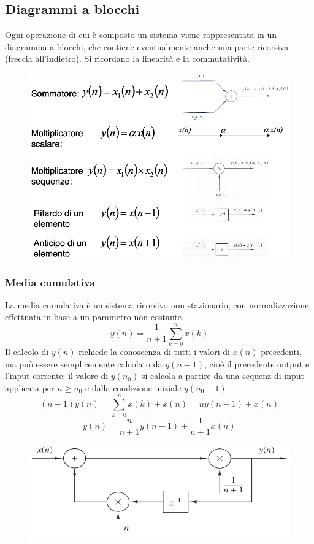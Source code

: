 \subsection{Diagrammi a blocchi}
Ogni operazione di cui è composto un sistema viene rappresentata in un diagramma a blocchi, che contiene eventualmente anche una parte ricorsiva (freccia all'indietro). Si ricordano la linearità e la commutatività.

\begin{figure}[h]
	\centering
	\includegraphics[scale=0.4]{Lezioni/Immagini/blocchi}
\end{figure}

\subsubsection{Media cumulativa}
La media cumulativa è un sistema ricorsivo non stazionario, con normalizzazione effettuata in base a un parametro non costante. 
$$y(n) = \frac{1}{n+1} \sum_{k=0}^{n}x(k)$$
Il calcolo di $y(n)$ richiede la conoscenza di tutti i valori di $x(n)$ precedenti, ma può essere semplicemente calcolato da $y(n-1)$, cioè il precedente output e l'input corrente: il valore di $y(n_0)$ si calcola a partire da una sequenz di input applicata per $n \geq n_0$ e dalla condizione iniziale $y(n_0 - 1)$.
$$(n + 1) y(n) = \sum_{k=0}^{n} x(k) + x(n) = ny(n-1) + x(n)$$
$$y(n) = \frac{n}{n+1} y(n-1) + \frac{1}{n+1} x(n)$$

\begin{figure}[h]
	\centering
	\includegraphics[scale=0.4]{Lezioni/Immagini/media}
\end{figure}

